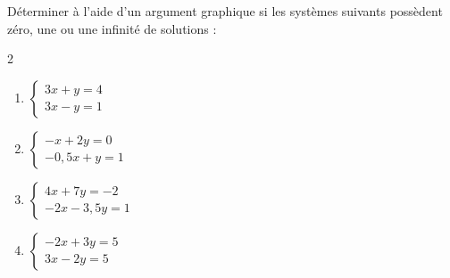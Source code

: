 \begin{exo}{}
	Déterminer à l'aide d'un argument graphique si les systèmes suivants possèdent zéro, une ou une infinité de solutions :
	\vspace*{-2mm}
	\begin{multicols}{2}
		\begin{enumerate}
			\item $\begin{cases} 3x + y = 4 \\ 3x - y = 1 \end{cases}$
			\item $\begin{cases} -x + 2y = 0 \\ -0,5x + y = 1 \end{cases}$
			\item $\begin{cases} 4x + 7y = -2 \\ -2x - 3,5y = 1 \end{cases}$
			\item $\begin{cases} -2x + 3y = 5 \\ 3x - 2y = 5 \end{cases}$
		\end{enumerate}
	\end{multicols}
\end{exo}
